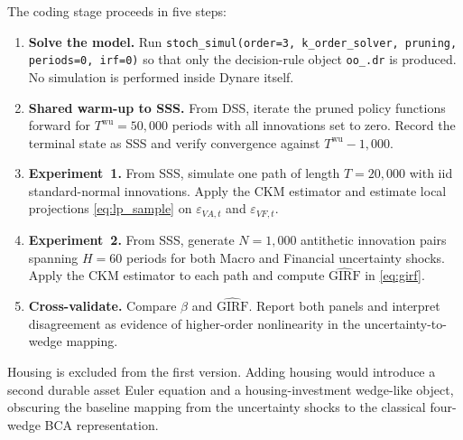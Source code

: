 The coding stage proceeds in five steps:
\begin{enumerate}[label=\textbf{Step \arabic*.}]
    \item \textbf{Solve the model.} Run \texttt{stoch\_simul(order=3,
    k\_order\_solver, pruning, periods=0, irf=0)} so that only the
    decision-rule object \texttt{oo\_.dr} is produced. No simulation is
    performed inside Dynare itself.
    \item \textbf{Shared warm-up to SSS.} From DSS, iterate the pruned policy
    functions forward for \(T^{\text{wu}}=50{,}000\) periods with all
    innovations set to zero. Record the terminal state as SSS and verify
    convergence against \(T^{\text{wu}}-1{,}000\).
    \item \textbf{Experiment~1.} From SSS, simulate one path of length
    \(T=20{,}000\) with iid standard-normal innovations. Apply the CKM
    estimator and estimate local projections \eqref{eq:lp_sample} on
    \(\varepsilon_{VA,t}\) and \(\varepsilon_{VF,t}\).
    \item \textbf{Experiment~2.} From SSS, generate \(N=1{,}000\) antithetic
    innovation pairs spanning \(H=60\) periods for both Macro and Financial
    uncertainty shocks. Apply the CKM estimator to each path and compute
    \(\widehat{\mathrm{GIRF}}\) in \eqref{eq:girf}.
    \item \textbf{Cross-validate.} Compare \(\beta\) and
    \(\widehat{\mathrm{GIRF}}\). Report both panels and interpret
    disagreement as evidence of higher-order nonlinearity in the
    uncertainty-to-wedge mapping.
\end{enumerate}

Housing is excluded from the first version. Adding housing would introduce a
second durable asset Euler equation and a housing-investment wedge-like
object, obscuring the baseline mapping from the uncertainty shocks to the classical
four-wedge BCA representation.
